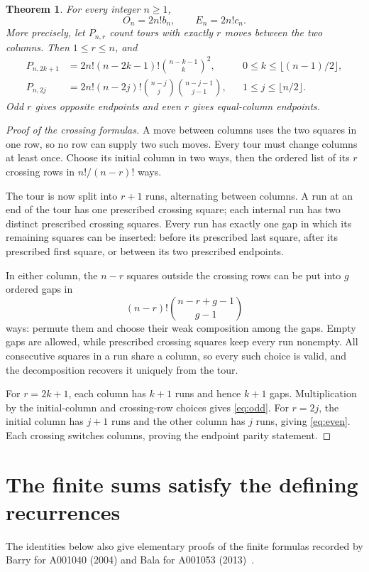 \documentclass[10pt]{article}
\newtheorem{theorem}{Theorem}
\begin{document}
\begin{theorem}\label{thm:main}
For every integer $n\ge1$,
\[
 O_n=2n!b_n,\qquad E_n=2n!c_n.
\]
More precisely, let $P_{n,r}$ count tours with exactly $r$ moves between the two columns. Then $1\le r\le n$, and
\begin{align}
 P_{n,2k+1}&=2n!(n-2k-1)!\binom{n-k-1}{k}^{\!2},
 &&0\le k\le\lfloor(n-1)/2\rfloor,\label{eq:odd}\\
 P_{n,2j}&=2n!(n-2j)!\binom{n-j}{j}\binom{n-j-1}{j-1},
 &&1\le j\le\lfloor n/2\rfloor.\label{eq:even}
\end{align}
Odd $r$ gives opposite endpoints and even $r$ gives equal-column endpoints.
\end{theorem}
\begin{proof}[Proof of the crossing formulas]
A move between columns uses the two squares in one row, so no row can supply two such moves. Every tour must change columns at least once. Choose its initial column in two ways, then the ordered list of its $r$ crossing rows in $n!/(n-r)!$ ways.

The tour is now split into $r+1$ runs, alternating between columns. A run at an end of the tour has one prescribed crossing square; each internal run has two distinct prescribed crossing squares. Every run has exactly one gap in which its remaining squares can be inserted: before its prescribed last square, after its prescribed first square, or between its two prescribed endpoints.

In either column, the $n-r$ squares outside the crossing rows can be put into $g$ ordered gaps in
\[
 (n-r)!\binom{n-r+g-1}{g-1}
\]
ways: permute them and choose their weak composition among the gaps. Empty gaps are allowed, while prescribed crossing squares keep every run nonempty. All consecutive squares in a run share a column, so every such choice is valid, and the decomposition recovers it uniquely from the tour.

For $r=2k+1$, each column has $k+1$ runs and hence $k+1$ gaps. Multiplication by the initial-column and crossing-row choices gives \eqref{eq:odd}. For $r=2j$, the initial column has $j+1$ runs and the other column has $j$ runs, giving \eqref{eq:even}. Each crossing switches columns, proving the endpoint parity statement.
\end{proof}

\section{The finite sums satisfy the defining recurrences}
The identities below also give elementary proofs of the finite formulas recorded by Barry for A001040 (2004) and Bala for A001053 (2013)~\cite{opposite,same}.
\end{document}
